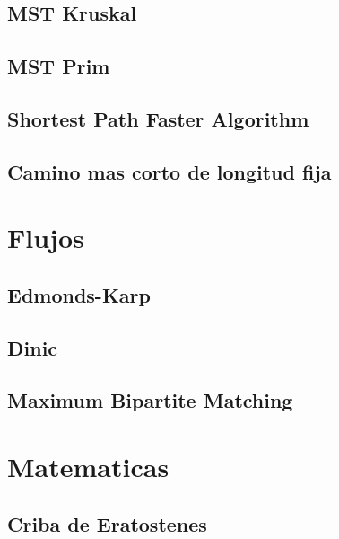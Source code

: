 \subsection{MST Kruskal}
\raggedbottom
\hrulefill
\subsection{MST Prim}
\raggedbottom
\hrulefill
\subsection{Shortest Path Faster Algorithm}
\raggedbottom
\hrulefill
\subsection{Camino mas corto de longitud fija}
\raggedbottom
\hrulefill

\section{Flujos}
\subsection{Edmonds-Karp}
\raggedbottom
\hrulefill
\subsection{Dinic}
\raggedbottom
\hrulefill
\subsection{Maximum Bipartite Matching}
\raggedbottom
\hrulefill

\section{Matematicas}
\subsection{Criba de Eratostenes}
\raggedbottom
\hrulefill
